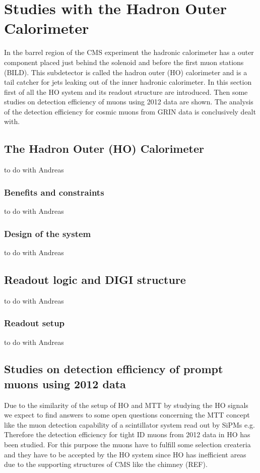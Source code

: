 \section{Studies with the Hadron Outer Calorimeter}
In the barrel region of the CMS experiment the hadronic calorimeter has a outer component placed just behind the solenoid and before the first muon stations (BILD). 
This subdetector is called the hadron outer (HO) calorimeter and is a tail catcher for jets leaking out of the inner hadronic calorimeter.
In this section first of all the HO system and its readout structure are introduced.
Then some studies on detection efficiency of muons using 2012 data are shown. The analysis of the detection efficiency for cosmic muons from GRIN data is conclusively dealt with.
	\subsection{The Hadron Outer (HO) Calorimeter}
		to do with Andreas
  		\subsubsection{Benefits and constraints}
			to do with Andreas
  		\subsubsection{Design of the system}
			to do with Andreas
	\subsection{Readout logic and DIGI structure}
		to do with Andreas
  		\subsubsection{Readout setup}
			to do with Andreas
	\subsection{Studies on detection efficiency of prompt muons using 2012 data}
		Due to the similarity of the setup of HO and MTT by studying the HO signals we expect to find answers to some open questions concerning the MTT concept like the muon detection capability of a
		scintillator system  read out by SiPMs e.g. Therefore the detection efficiency for tight ID muons from 2012 data in HO has been studied.
		For this purpose the muons have to fulfill some selection createria and they have to be accepted by the HO system since HO has inefficient areas due to the supporting structures of CMS like the
		chimney (REF).
